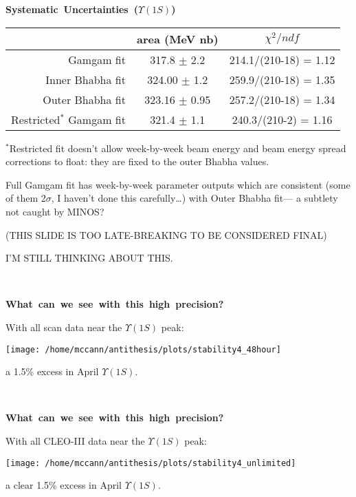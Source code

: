 \documentclass[landscape]{article}
\newenvironment{slide}[1][ ]{\mbox{\boldmath \bf #1 } \vfill}{\vfill \mbox{ } \pagebreak}
\begin{document}
\begin{slide}[Systematic Uncertainties ($\Upsilon(1S)$)]

\begin{center}
  \renewcommand{\arraystretch}{2}
  \begin{tabular}{r c c}
               & area (MeV nb) & $\chi^2/ndf$ \\\hline
    Gamgam fit & 317.8 $\pm$ 2.2 & 214.1/(210-18) = 1.12 \\
    Inner Bhabha fit & 324.00 $\pm$ 1.2 & 259.9/(210-18) = 1.35 \\
    Outer Bhabha fit & 323.16 $\pm$ 0.95 & 257.2/(210-18) = 1.34 \\
    Restricted$^*$ Gamgam fit & 321.4 $\pm$ 1.1 & 240.3/(210-2) = 1.16 \\
  \end{tabular}
\end{center}

\vfill
$^*$Restricted fit doesn't allow week-by-week beam energy and beam
energy spread corrections to float: they are fixed to the outer Bhabha values.

\vfill Full Gamgam fit has week-by-week parameter outputs which are
consistent (some of them 2$\sigma$, I haven't done this
carefully\ldots) with Outer Bhabha fit--- a subtlety not caught by MINOS?

\vfill
\begin{center}
(THIS SLIDE IS TOO LATE-BREAKING TO BE CONSIDERED FINAL)

I'M STILL THINKING ABOUT THIS.
\end{center}

\end{slide}

\begin{slide}[What can we see with this high precision?]

With all scan data near the $\Upsilon(1S)$ peak:

\vfill
\begin{center}
  \texttt{[image: /home/mccann/antithesis/plots/stability4\_48hour]}
\end{center}

\vfill
a 1.5\% excess in April $\Upsilon(1S)$.

\end{slide}

\begin{slide}[What can we see with this high precision?]

With all CLEO-III data near the $\Upsilon(1S)$ peak:

\vfill
\begin{center}
  \texttt{[image: /home/mccann/antithesis/plots/stability4\_unlimited]}
\end{center}

\vfill
a clear 1.5\% excess in April $\Upsilon(1S)$.

\end{slide}
\end{document}
